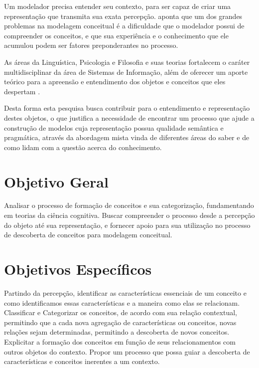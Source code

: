 Um modelador precisa entender seu contexto, para ser capaz de criar uma representação que transmita sua exata percepção.   aponta que um dos grandes problemas na modelagem conceitual é a dificuldade que o modelador possui de compreender os conceitos, e que sua experiência e o conhecimento que ele acumulou podem ser fatores preponderantes no processo.

As áreas da Linguística, Psicologia e Filosofia e suas teorias fortalecem o caráter multidisciplinar da área de Sistemas de Informação, além de oferecer um aporte teórico para a apreensão e entendimento dos objetos e conceitos que eles despertam \cite{lacerda:2012.linguagem}.

Desta forma esta pesquisa busca contribuir para o entendimento e representação destes objetos, o que justifica a necessidade de encontrar um processo que ajude a construção de modelos cuja representação possua qualidade semântica e pragmática, através da abordagem mista vinda de diferentes áreas do saber e de como lidam com a questão acerca do conhecimento.

\section{\hspace*{3pt} Objetivo Geral}

Analisar o processo de formação de conceitos e sua categorização, fundamentando em teorias da ciência cognitiva. Buscar compreender o processo desde a percepção do objeto até sua representação, e fornecer apoio para sua utilização no processo de descoberta de conceitos para modelagem conceitual.

\section{\hspace*{3pt} Objetivos Específicos}

Partindo da percepção, identificar as características essenciais de um conceito e como identificamos essas características e a maneira como elas se relacionam.
Classificar e Categorizar os conceitos, de acordo com sua relação contextual, permitindo que a cada nova agregação de características ou conceitos, novas relações sejam determinadas, permitindo a descoberta de novos conceitos.
Explicitar a formação dos conceitos em função de seus relacionamentos com outros objetos do contexto.
Propor um processo que possa guiar a descoberta de características e conceitos inerentes a um contexto.

